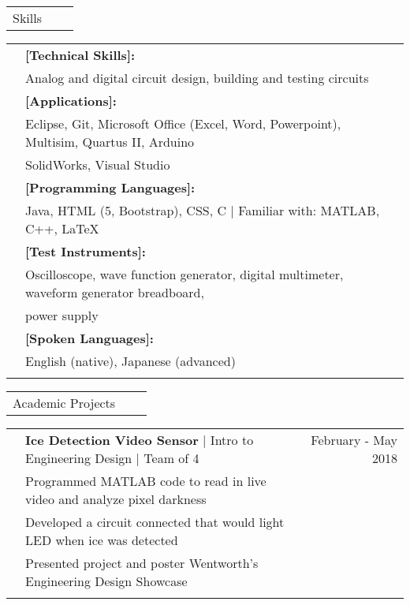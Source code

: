 \documentclass[letterpaper,10pt,oneside]{article}
\begin{document}
 \noindent \begin{tabularx}{\linewidth}{@{} l l R } 
     \Large{Skills}\\
 \end{tabularx}
 \noindent \begin{tabularx}{\linewidth}{@{} l l l }
 	 &\textbf{[Technical Skills]:}\\
 	 &Analog and digital circuit design, building and testing circuits\\
     &\textbf{[Applications]:}\\
     &Eclipse, Git, Microsoft Office (Excel, Word, Powerpoint), Multisim, Quartus II, Arduino\\
     &SolidWorks, Visual Studio\\
     &\textbf{[Programming Languages]:}\\
     &Java, HTML (5, Bootstrap), CSS, C $\mid$ Familiar with: MATLAB, C++, \LaTeX  \\
     &\textbf{[Test Instruments]:}\\
     &Oscilloscope, wave function generator, digital multimeter, waveform generator breadboard,\\
     &power supply\\
     &\textbf{[Spoken Languages]:}\\
     &English (native), Japanese (advanced) \\
     \\
 \end{tabularx}

 \noindent \begin{tabularx}{\linewidth}{@{} l l R } 
     \Large{Academic Projects}\\
 \end{tabularx}
 \noindent \begin{tabularx}{\linewidth}{@{} l l R }     
     & \textbf{Ice Detection Video Sensor} $\mid$ Intro to Engineering Design $\mid$ Team of 4 & February - May 2018 \\
     &Programmed MATLAB code to read in live video and analyze pixel darkness\\
     &Developed a circuit connected that would light LED when ice was detected\\
     &Presented project and poster Wentworth's Engineering Design Showcase\\
     \\
\end{tabularx}
\end{document}
